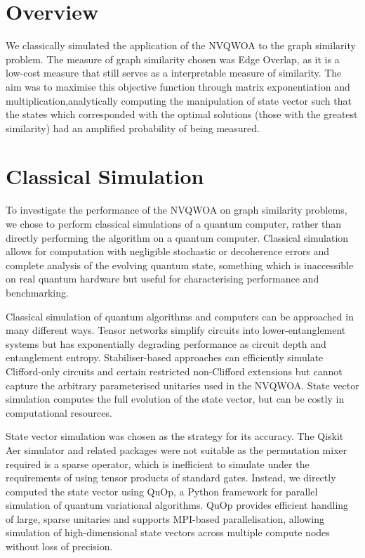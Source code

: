 \section{Overview}
We classically simulated the application of the NVQWOA to the graph similarity problem. The measure of graph similarity chosen was Edge Overlap, as it is a low-cost measure that still serves as a interpretable measure of similarity. The aim was to maximise this objective function through matrix exponentiation and multiplication,analytically computing the manipulation of state vector such that the states which corresponded with the optimal solutions (those with the greatest similarity) had an amplified probability of being measured.

\section{Classical Simulation}
To investigate the performance of the NVQWOA on graph similarity problems, we chose to perform classical simulations of a quantum computer, rather than directly performing the algorithm on a quantum computer. Classical simulation allows for computation with negligible stochastic or decoherence errors and complete analysis of the evolving quantum state, something which is inaccessible on real quantum hardware but useful for characterising performance and benchmarking.

Classical simulation of quantum algorithms and computers can be approached in many different ways. Tensor networks simplify circuits into lower-entanglement systems but has exponentially degrading performance as circuit depth and entanglement entropy. Stabiliser-based approaches can efficiently simulate Clifford-only circuits and certain restricted non-Clifford extensions but cannot capture the arbitrary parameterised unitaries used in the NVQWOA. State vector simulation computes the full evolution of the state vector, but can be costly in computational resources.

State vector simulation was chosen as the strategy for its accuracy. The Qiskit Aer simulator and related packages were not suitable as the permutation mixer required is a sparse operator, which is inefficient to simulate under the requirements of using tensor products of standard gates. Instead, we directly computed the state vector using QuOp, a Python framework for parallel simulation of quantum variational algorithms\cite{QuOp_MPI_paper_variational,QuOp_MPI}. QuOp provides efficient handling of large, sparse unitaries and supports MPI-based parallelisation, allowing simulation of high-dimensional state vectors across multiple compute nodes without loss of precision.

